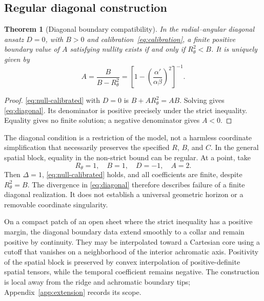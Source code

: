 \documentclass[9pt,twocolumn,twoside]{opticajnl}
\theoremstyle{plain}
\newtheorem{theorem}[proposition]{Theorem}
\begin{document}
\subsection{Regular diagonal construction}
\begin{theorem}[Diagonal boundary compatibility]
\label{thm:diagonal}
In the radial--angular diagonal ansatz $D=0$, with $B>0$ and calibration~\eqref{eq:calibration}, a finite positive boundary value of $A$ satisfying nullity exists if and only if $R_\theta^2<B$. It is uniquely given by
\begin{equation}
 A=\frac{B}{B-R_\theta^2}
 =\left[1-\left(\frac{\alpha'}{\alpha\beta}\right)^2\right]^{-1}.
 \label{eq:diagonal}
\end{equation}
\end{theorem}
\begin{proof}
\eqref{eq:null-calibrated} with $D=0$ is $B+AR_\theta^2=AB$. Solving gives \eqref{eq:diagonal}. Its denominator is positive precisely under the strict inequality. Equality gives no finite solution; a negative denominator gives $A<0$.
\end{proof}

The diagonal condition is a restriction of the model, not a harmless coordinate simplification that necessarily preserves the specified $R$, $B$, and $C$. In the general spatial block, equality in the non-strict bound can be regular. At a point, take
\begin{equation}
 R_\theta=1,\quad B=1,\quad D=-1,\quad A=2.
 \label{eq:equality}
\end{equation}
Then $\Delta=1$, \eqref{eq:null-calibrated} holds, and all coefficients are finite, despite $R_\theta^2=B$. The divergence in \eqref{eq:diagonal} therefore describes failure of a finite diagonal realization. It does not establish a universal geometric horizon or a removable coordinate singularity.

On a compact patch of an open sheet where the strict inequality has a positive margin, the diagonal boundary data extend smoothly to a collar and remain positive by continuity. They may be interpolated toward a Cartesian core using a cutoff that vanishes on a neighborhood of the interior achromatic axis. Positivity of the spatial block is preserved by convex interpolation of positive-definite spatial tensors, while the temporal coefficient remains negative. The construction is local away from the ridge and achromatic boundary tips; Appendix~\ref{app:extension} records its scope.
\end{document}
